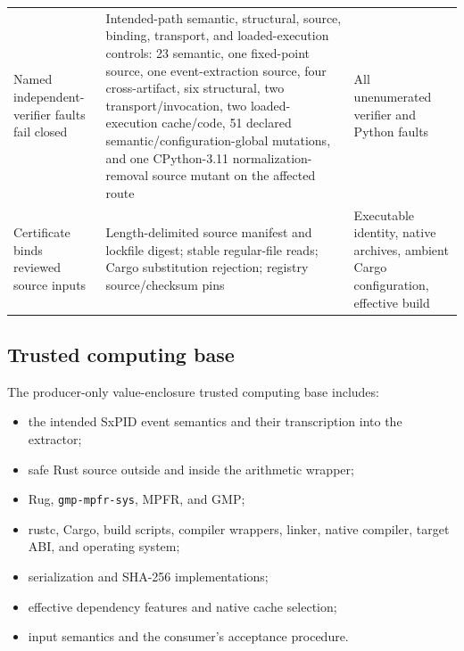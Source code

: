 \documentclass[11pt]{article}
\theoremstyle{definition}
\begin{document}
\begin{longtable}{L{0.31\textwidth}L{0.31\textwidth}L{0.28\textwidth}}
Named independent-verifier faults fail closed & Intended-path semantic, structural, source,
binding, transport, and loaded-execution controls: 23 semantic, one fixed-point source, one
event-extraction source, four cross-artifact, six structural, two transport/invocation, two
loaded-execution cache/code, 51 declared semantic/configuration-global mutations, and one
CPython-3.11 normalization-removal source mutant on the affected route & All unenumerated verifier and
Python faults \\
Certificate binds reviewed source inputs & Length-delimited source manifest and lockfile digest;
stable regular-file reads; Cargo substitution rejection; registry source/checksum pins &
Executable identity, native archives, ambient Cargo configuration, effective build \\
\bottomrule
\end{longtable}

\subsection{Trusted computing base}

The producer-only value-enclosure trusted computing base includes:
\begin{itemize}[leftmargin=*]
  \item the intended SxPID event semantics and their transcription into the extractor;
  \item safe Rust source outside and inside the arithmetic wrapper;
  \item Rug, \texttt{gmp-mpfr-sys}, MPFR, and GMP;
  \item rustc, Cargo, build scripts, compiler wrappers, linker, native compiler, target ABI, and
  operating system;
  \item serialization and SHA-256 implementations;
  \item effective dependency features and native cache selection;
  \item input semantics and the consumer's acceptance procedure.
\end{itemize}
\end{document}
